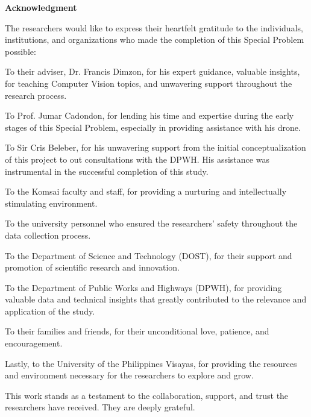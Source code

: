 \begin{center}
	\textbf{Acknowledgment}
\end{center}

The researchers would like to express their heartfelt gratitude to the individuals, institutions, and organizations who made the completion of this Special Problem possible:

To their adviser, Dr. Francis Dimzon, for his expert guidance, valuable insights, for teaching Computer Vision topics, and unwavering support throughout the research process.

To Prof. Jumar Cadondon, for lending his time and expertise during the early stages of this Special Problem, especially in providing assistance with his drone.

To Sir Cris Beleber, for his unwavering support from the initial conceptualization of this project to out consultations with the DPWH. His assistance was instrumental in the successful completion of this study.

To the Komsai faculty and staff, for providing a nurturing and intellectually stimulating environment.

To the university personnel who ensured the researchers' safety throughout the data collection process.

To the Department of Science and Technology (DOST), for their support and promotion of scientific research and innovation.

To the Department of Public Works and Highways (DPWH), for providing valuable data and technical insights that greatly contributed to the relevance and application of the study.

To their families and friends, for their unconditional love, patience, and encouragement.

Lastly, to the University of the Philippines Visayas, for providing the resources and environment necessary for the researchers to explore and grow.

This work stands as a testament to the collaboration, support, and trust the researchers have received. They are deeply grateful.